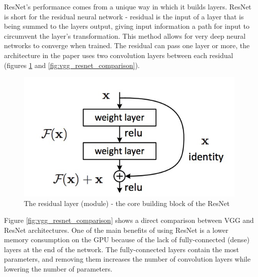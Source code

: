 \documentclass[times, utf8, diplomski]{fer}
\begin{document}
ResNet's performance comes from a unique way in which it builds layers. ResNet is short for the residual neural network - residual is the input of a layer that is being summed to the layers output, giving input information a path for input to circumvent the layer's transformation. This method allows for very deep neural networks to converge when trained. The residual can pass one layer or more, the architecture in the paper uses two convolution layers between each residual (figures \ref{fig:residual_layer} and \ref{fig:vgg_resnet_comparison}).

\begin{figure}
  \includegraphics[scale=0.55]{figures/resiudal_layer.jpg}
  \centering
  \caption{The residual layer (module) - the core building block of the ResNet }
  \label{fig:residual_layer}
\end{figure}

Figure \ref{fig:vgg_resnet_comparison} shows a direct comparison between VGG and ResNet architectures. One of the main benefits of using ResNet is a lower memory consumption on the GPU because of the lack of fully-connected (dense) layers at the end of the network. The fully-connected layers contain the most parameters, and removing them increases the number of convolution layers while lowering the number of parameters.
\end{document}
